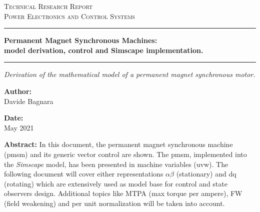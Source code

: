 \documentclass[12pt,a4paper]{scrartcl}
\newcommand{\DocCategory}{Technical Research Report}
\newcommand{\DocField}{Power Electronics and Control Systems}
\newcommand{\DocTitle}{%
	{\fontsize{20}{24}\selectfont\bfseries Permanent Magnet Synchronous Machines:} \\[16pt]
	{\fontsize{16}{20}\selectfont\bfseries model derivation, control and Simscape implementation.}
}
\newcommand{\DocSubtitle}{%
	Derivation of the mathematical model of a permanent magnet synchronous motor. 
}
\newcommand{\DocAuthor}{Davide Bagnara}
\newcommand{\DocDate}{May 2021}
\newcommand{\DocAbstract}{%
	In this document, the permanent magnet synchronous machine (pmsm) and its generic vector control are shown. The pmsm, implemented into the \textit{Simscape} model, has been presented in machine variables (uvw). The following document will cover either representations $\alpha\beta$ (stationary) and dq (rotating) which are extensively used as model base for control and state observers design. Additional topics like MTPA (max torque per ampere), FW (field weakening) and per unit normalization will be taken into account. 
}
\begin{document}
\titlepage
\begin{center}
	{\Large\scshape \DocCategory}\\[8pt]
	{\large\scshape \DocField}
\end{center}

\vspace{36pt}
\noindent\rule{\linewidth}{0.8pt}

\begin{center}
	\DocTitle
\end{center}

\vspace{4pt}
\noindent\rule{\linewidth}{2.2pt}

\begin{center}
	\begin{onehalfspace}
		{\large\itshape \DocSubtitle}
	\end{onehalfspace}
\end{center}

\vspace{36pt}

\begin{minipage}{0.92\linewidth}
	\noindent
	\begin{minipage}[t]{0.48\linewidth}
		\textbf{Author:}\\[2pt]
		\DocAuthor
	\end{minipage}%
	\hfill
	\begin{minipage}[t]{0.48\linewidth}
		\raggedleft
		\textbf{Date:}\\[2pt]
		\DocDate
	\end{minipage}
\end{minipage}
\vspace{36pt}

\begin{center}
	\begin{minipage}{0.85\linewidth}
		\footnotesize 
		\begin{onehalfspace}
			\textbf{Abstract:} \DocAbstract
		\end{onehalfspace}
	\end{minipage}
\end{center}

\vfill
\end{document}
